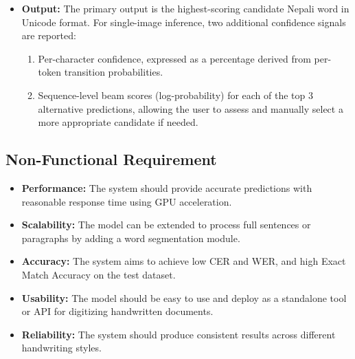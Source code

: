 \begin{itemize}
    \item \textbf{Output:} The primary output is the highest-scoring candidate Nepali word in Unicode format. For single-image inference, two additional confidence signals are reported:
\begin{enumerate}
    \item Per-character confidence, expressed as a percentage derived from 
    per-token transition probabilities.
    \item Sequence-level beam scores (log-probability) for each of the top 
    3 alternative predictions, allowing the user to assess and manually 
    select a more appropriate candidate if needed.
\end{enumerate}
\end{itemize}

\subsection{Non-Functional Requirement}
\begin{itemize}
    \item \textbf{Performance:} The system should provide accurate predictions with reasonable response time using GPU acceleration.

    \item \textbf{Scalability:} The model can be extended to process full sentences or paragraphs by adding a word segmentation module.

    \item \textbf{Accuracy:} The system aims to achieve low CER and WER, and high Exact Match Accuracy on the test dataset.

    \item \textbf{Usability:} The model should be easy to use and deploy as a standalone tool or API for digitizing handwritten documents.

    \item \textbf{Reliability:} The system should produce consistent results across different handwriting styles.
\end{itemize}
\newpage
